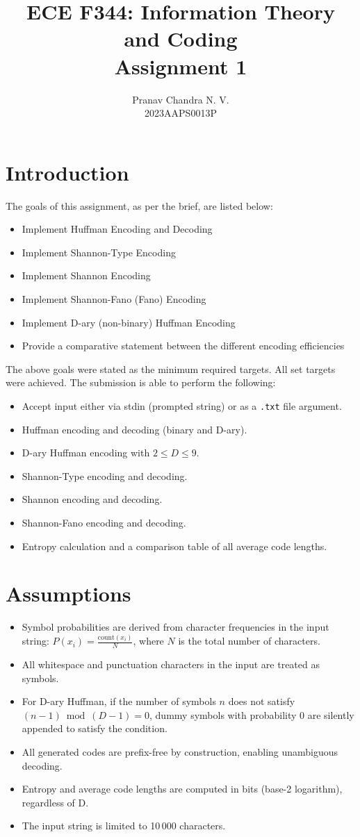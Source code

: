 \documentclass{AnantDocumentation}
\title{ECE F344: Information Theory and Coding \\ Assignment 1}
\author{Pranav Chandra N. V. \\ 2023AAPS0013P}
\begin{document}
\maketitle
\tableofcontents
\newpage

\section{Introduction}
The goals of this assignment, as per the brief, are listed below:
\begin{itemize}
	\item Implement Huffman Encoding and Decoding
	\item Implement Shannon-Type Encoding
	\item Implement Shannon Encoding
	\item Implement Shannon-Fano (Fano) Encoding
	\item Implement D-ary (non-binary) Huffman Encoding
	\item Provide a comparative statement between the different encoding efficiencies
\end{itemize}
The above goals were stated as the minimum required targets. All set targets were achieved. The submission is able to perform the following:
\begin{itemize}
	\item Accept input either via stdin (prompted string) or as a \texttt{.txt} file argument.
	\item Huffman encoding and decoding (binary and D-ary).
	\item D-ary Huffman encoding with $2 \le D \le 9$.
	\item Shannon-Type encoding and decoding.
	\item Shannon encoding and decoding.
	\item Shannon-Fano encoding and decoding.
	\item Entropy calculation and a comparison table of all average code lengths.
\end{itemize}

\section{Assumptions}
\begin{itemize}
	\item Symbol probabilities are derived from character frequencies in the input string:
	      $P(x_i) = \frac{\text{count}(x_i)}{N}$, where $N$ is the total number of characters.
	\item All whitespace and punctuation characters in the input are treated as symbols.
	\item For D-ary Huffman, if the number of symbols $n$ does not satisfy $(n-1) \bmod (D-1) = 0$,
	      dummy symbols with probability 0 are silently appended to satisfy the condition.
	\item All generated codes are prefix-free by construction, enabling unambiguous decoding.
	\item Entropy and average code lengths are computed in bits (base-2 logarithm), regardless of D.
	\item The input string is limited to 10\,000 characters.
\end{itemize}
\end{document}
